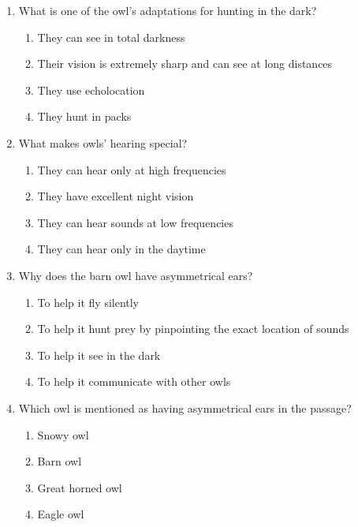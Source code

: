\documentclass[12pt]{article}
\begin{document}
\begin{enumerate}
\item What is one of the owl's adaptations for hunting in the dark?
\begin{enumerate}[label=\Alph*.]
    \item They can see in total darkness
    \item Their vision is extremely sharp and can see at long distances
    \item They use echolocation
    \item They hunt in packs
\end{enumerate}

\vspace{0.5cm}

\item What makes owls' hearing special?
\begin{enumerate}[label=\Alph*.]
    \item They can hear only at high frequencies
    \item They have excellent night vision
    \item They can hear sounds at low frequencies
    \item They can hear only in the daytime
\end{enumerate}

\vspace{0.5cm}

\item Why does the barn owl have asymmetrical ears?
\begin{enumerate}[label=\Alph*.]
    \item To help it fly silently
    \item To help it hunt prey by pinpointing the exact location of sounds
    \item To help it see in the dark
    \item To help it communicate with other owls
\end{enumerate}

\vspace{0.5cm}

\item Which owl is mentioned as having asymmetrical ears in the passage?
\begin{enumerate}[label=\Alph*.]
    \item Snowy owl
    \item Barn owl
    \item Great horned owl
    \item Eagle owl
\end{enumerate}


\end{enumerate}
\end{document}
